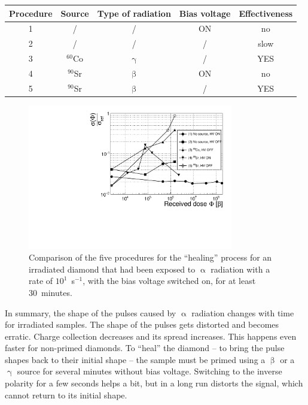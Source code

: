 \begin{footnotesize}
\begin{center}
\begin{tabular}{   c  c  c  c c }
\hline
Procedure & Source & Type of radiation & Bias voltage & Effectiveness \\
\hline
1 & /                   & /                 & ON    & no \\
2 & /                   & /                 & /        & slow \\
3 & $^{60}$Co   & $\upgamma$ &/         & YES \\
4 & $^{90}$Sr    & $\upbeta$      & ON    & no \\
5 & $^{90}$Sr    & $\upbeta$      & /         & YES \\
\hline
\end{tabular}
\label{tab:healing}
\end{center}
\end{footnotesize}

\begin{figure}[!t]
\begin{center}
\includegraphics[width=0.8\textwidth]{03_measurement_results/scripts/plots/plotLifetime/formCorrelation}
\caption{Comparison of the five procedures for the ``healing'' process for an irradiated diamond that had been exposed to $\upalpha$ radiation with a rate of $10^1$~s$^{-1}$, with the bias voltage switched on, for at least 30~minutes.}
\label{fig:formCorr}
\end{center}
\end{figure}


In summary, the shape of the pulses caused by $\upalpha$ radiation changes with time for irradiated samples. The shape of the pulses gets distorted and becomes erratic. Charge collection decreases and its spread increases. This happens even faster for non-primed diamonds. To ``heal'' the diamond -- to bring the pulse shapes back to their initial shape -- the sample must be primed using a $\upbeta$ or a $\upgamma$ source for several minutes without bias voltage. Switching to the inverse polarity for a few seconds helps a bit, but in a long run distorts the signal, which cannot return to its initial shape.










